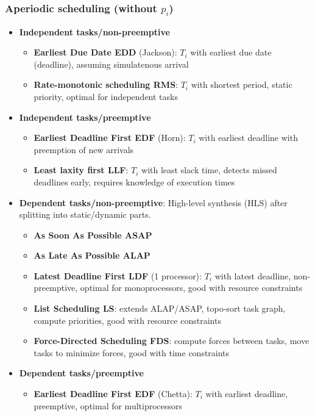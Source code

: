 \documentclass{article}
\begin{document}
\subsubsection{Aperiodic scheduling (without $p_i$)}
\begin{itemize}
  \item \textbf{Independent tasks/non-preemptive}
        \begin{itemize}
          \item \textbf{Earliest Due Date EDD} (Jackson): $T_i$ with earliest due date (deadline), assuming simulatenous arrival
          \item \textbf{Rate-monotonic scheduling RMS}: $T_i$ with shortest period, static priority, optimal for independent tasks
        \end{itemize}
  \item \textbf{Independent tasks/preemptive}
        \begin{itemize}
          \item \textbf{Earliest Deadline First EDF} (Horn): $T_i$ with earliest deadline with preemption of new arrivals
          \item \textbf{Least laxity first LLF}: $T_i$ with least slack time, detects missed deadlines early, requires knowledge of execution times
        \end{itemize}
  \item \textbf{Dependent tasks/non-preemptive}: High-level synthesis (HLS) after splitting into static/dynamic parts.
        \begin{itemize}
          \item \textbf{As Soon As Possible ASAP}
          \item \textbf{As Late As Possible ALAP}
          \item \textbf{Latest Deadline First LDF} (1 processor): $T_i$ with latest deadline, non-preemptive, optimal for monoprocessors, good with resource constraints
          \item \textbf{List Scheduling LS}: extends ALAP/ASAP, topo-sort task graph, compute priorities, good with resource constraints
          \item \textbf{Force-Directed Scheduling FDS}: compute forces between tasks, move tasks to minimize forces, good with time constraints
        \end{itemize}
  \item \textbf{Dependent tasks/preemptive}
        \begin{itemize}
          \item \textbf{Earliest Deadline First EDF} (Chetta): $T_i$ with earliest deadline, preemptive, optimal for multiprocessors
        \end{itemize}
\end{itemize}
\end{document}
